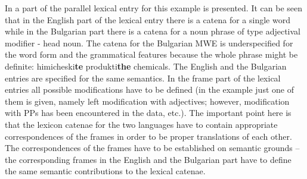 \documentclass[output=paper]{langsci/langscibook}
\begin{document}
In  a part of the parallel lexical entry for this example
is presented. It can be seen that in the English part of the lexical entry
there is a catena for a single word while in the Bulgarian part there is a
catena for a noun phrase of type adjectival modifier - head noun. The catena
for the Bulgarian MWE is underspecified for the word form and the
grammatical features because the whole phrase might be definite:  
{himicheski{\bf te}
produkti}{{\bf the} chemicals}. The English
and the Bulgarian entries are specified for the same semantics. In the frame
part of the lexical entries all possible modifications have to be defined
(in the example just one of them is given, namely left modification with
adjectives; however, modification with PPs has been encountered in the data,
etc.). The important point here is that the lexicon catenae for the two
languages have to contain appropriate correspondences of the frames in order
to be proper translations of each other. The correspondences of the
frames have to be established on semantic grounds -- the corresponding
frames in the English and the Bulgarian part have to define the same
semantic contributions to the lexical catenae.
\end{document}
